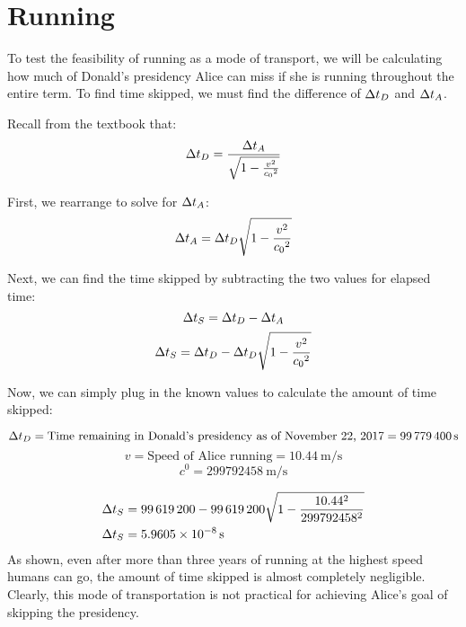 \section{Running}
	To test the feasibility of running as a mode of transport, we will be calculating how much of Donald’s presidency Alice can miss if she is running throughout the entire term. To find time skipped, we must find the difference of $\mathrm{\Delta} t_D$ and $\mathrm{\Delta} t_A$.

	Recall from the textbook \autocite{textbook} that:
	\[\Del t_D = \frac{\Del t_A}{\sqrt{1 - \frac{v^2}{\si{\clight}^2}}}\]

	First, we rearrange to solve for $\mathrm{\Delta} t_A$:
	\[\Del t_A = \Del t_D \sqrt{1 - \frac{v^2}{\si{\clight}^2}}\]

	Next, we can find the time skipped by subtracting the two values for elapsed time:
	\[\mathrm{\Delta} t_S = \mathrm{\Delta} t_D - \mathrm{\Delta} t_A\]
	\[\Del t_S = \Del t_D - \Del t_D\sqrt{1 - \frac{v^2}{\si{\clight}^2}}\]

	Now, we can simply plug in the known values to calculate the amount of time skipped:

	\[\mathrm{\Delta} t_D = \text{Time remaining in Donald's presidency as of November 22, 2017} = \SI{99779400}{\second}\]
	\[v = \text{Speed of Alice running} = \SI{10.44}{\metre/\second}\]
	\[\si{\clight} = \SI{299792458}{\metre/\second}\]

	\begin{align*}
		\mathrm{\Delta} t_S &= \num{99619200} - \num{99619200} \sqrt {1- \frac{10.44^2}{299792458^2}}\\
		\mathrm{\Delta} t_S &= \SI{5.9605e-8}{\second}
	\end{align*}
	As shown, even after more than three years of running at the highest speed humans can go, the amount of time skipped is almost completely negligible. Clearly, this mode of transportation is not practical for achieving Alice's goal of skipping the presidency.
